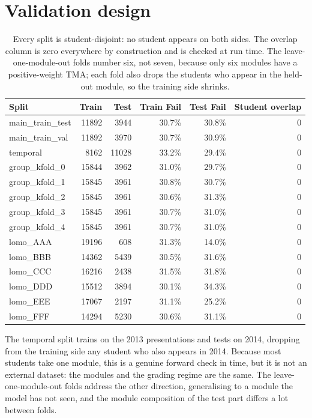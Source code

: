 \documentclass[11pt]{article}
\begin{document}
\section{Validation design}
\begin{table}[t]
\centering
\footnotesize\setlength{\tabcolsep}{3pt}
\begin{tabular}{lrrrrr}
\toprule
Split & Train & Test & Train Fail & Test Fail & Student overlap \\
\midrule
main\_train\_test & 11892 & 3944 & 30.7\% & 30.8\% & 0 \\
main\_train\_val & 11892 & 3970 & 30.7\% & 30.9\% & 0 \\
temporal & 8162 & 11028 & 33.2\% & 29.4\% & 0 \\
group\_kfold\_0 & 15844 & 3962 & 31.0\% & 29.7\% & 0 \\
group\_kfold\_1 & 15845 & 3961 & 30.8\% & 30.7\% & 0 \\
group\_kfold\_2 & 15845 & 3961 & 30.6\% & 31.3\% & 0 \\
group\_kfold\_3 & 15845 & 3961 & 30.7\% & 31.0\% & 0 \\
group\_kfold\_4 & 15845 & 3961 & 30.7\% & 31.0\% & 0 \\
lomo\_AAA & 19196 & 608 & 31.3\% & 14.0\% & 0 \\
lomo\_BBB & 14362 & 5439 & 30.5\% & 31.6\% & 0 \\
lomo\_CCC & 16216 & 2438 & 31.5\% & 31.8\% & 0 \\
lomo\_DDD & 15512 & 3894 & 30.1\% & 34.3\% & 0 \\
lomo\_EEE & 17067 & 2197 & 31.1\% & 25.2\% & 0 \\
lomo\_FFF & 14294 & 5230 & 30.6\% & 31.1\% & 0 \\
\bottomrule
\end{tabular}
\caption{Every split is student-disjoint: no student appears on both sides. The overlap column is zero everywhere by construction and is checked at run time. The leave-one-module-out folds number six, not seven, because only six modules have a positive-weight TMA; each fold also drops the students who appear in the held-out module, so the training side shrinks.}
\label{tab:splits}
\end{table}
The temporal split trains on the 2013 presentations and tests on 2014, dropping from the training side any student who also appears in 2014. Because most students take one module, this is a genuine forward check in time, but it is not an external dataset: the modules and the grading regime are the same. The leave-one-module-out folds address the other direction, generalising to a module the model has not seen, and the module composition of the test part differs a lot between folds.
\end{document}
